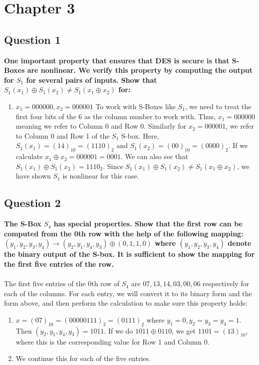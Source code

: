 \documentclass[titlepage]{article}
\begin{document}
\section{Chapter 3}
{
\subsection{Question 1}
{
\textbf{One important property that ensures that DES is secure is that S-Boxes are nonlinear. We verify this property by computing the output for \(S_1\) for several pairs of inputs. Show that \(S_1(x_1) \oplus S_1(x_2) \neq S_1(x_1 \oplus x_2)\) for:}
\begin{enumerate}
    \item \(x_1 = 000000, x_2 = 000001\)
    To work with S-Boxes like \(S_1\), we need to treat the first four bits of the 6 as the column number to work with. Thus, \(x_1 = 0000 00\) meaning we refer to Column 0 and Row 0. Similarly for \(x_2 = 0000 01\), we refer to Column 0 and Row 1 of the \(S_1\) S-box. Here, \(S_1(x_1) = (14)_{10} = (1110)_2\) and \(S_1(x_2) = (00)_{10} = (0000)_2\). If we calculate \(x_1 \oplus x_2 = 000001 = 0001\). We can also see that \(S_1(x_1) \oplus S_1(x_2) = 1110_2\). Since \(S_1(x_1) \oplus S_1(x_2) \neq S_1(x_1 \oplus x_2)\), we have shown \(S_1\) is nonlinear for this case.
\end{enumerate}
}
\subsection{Question 2}
{
\textbf{The S-Box \(S_4\) has special properties. Show that the first row can be computed from the 0th row with the help of the following mapping: \((y_1, y_2, y_3, y_4) \rightarrow (y_2, y_1, y_4, y_3) \oplus (0, 1, 1, 0)\) where \((y_1, y_2, y_3, y_4)\) denote the binary output of the S-box. It is sufficient to show the mapping for the first five entries of the row.}\\\\
The first five entries of the 0th row of \(S_4\) are \(07, 13, 14, 03, 00, 06\) respectively for each of the columns. For each entry, we will convert it to its binary form and the form above, and then perform the calculation to make sure this property holds:
\begin{enumerate}
    \item \(x = (07)_{10} = (0000 0111)_2 = (0111)_2\) where \(y_1 = 0, y_2 = y_3 = y_4 = 1\). Then \((y_2, y_1, y_4, y_3) = 1011\). If we do \(1011 \oplus 0110\), we get \(1101 = (13)_{10}\), where this is the corresponding value for Row 1 and Column 0.
    \item We continue this for each of the five entries.
\end{enumerate}
}
}
\end{document}
